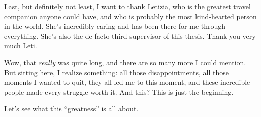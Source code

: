 \documentclass[12pt,a4paper,openright,twoside]{report}
\begin{document}
Last, but definitely not least, I want to thank Letizia, who is the greatest travel companion anyone could have, and who is probably the most kind-hearted person in the world. She's incredibly caring and has been there for me through everything. She's also the de facto third supervisor of this thesis. Thank you very much Leti.

Wow, that \textit{really} was quite long, and there are so many more I could mention. But sitting here, I realize something: all those disappointments, all those moments I wanted to quit, they all led me to this moment, and these incredible people made every struggle worth it. And this? This is just the beginning.

Let's see what this ``greatness'' is all about.
\end{document}

